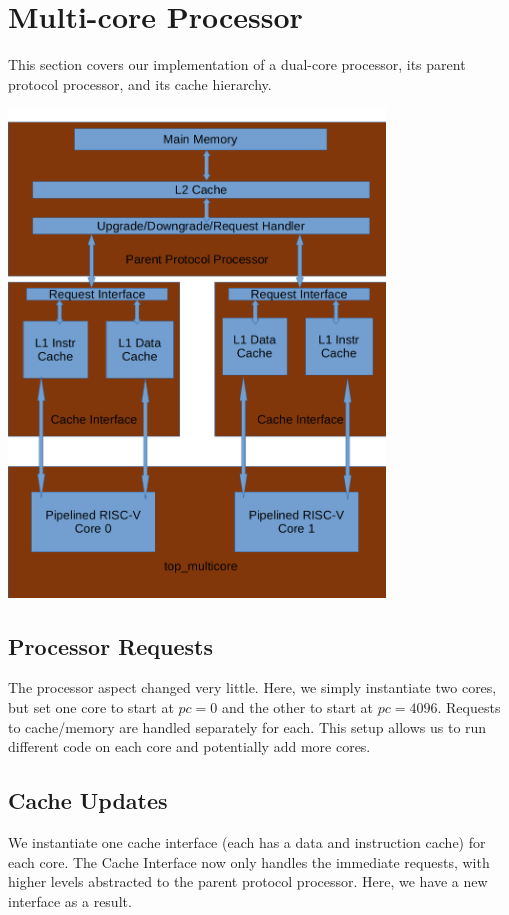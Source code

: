 \documentclass{article}
\begin{document}
\section{Multi-core Processor}

This section covers our implementation of a dual-core processor, its parent protocol processor, and its cache hierarchy.

\includegraphics[width=10cm]{multicore.png}

\subsection{Processor Requests}

The processor aspect changed very little. Here, we simply instantiate two cores, but set one core to start at $pc=0$ and the other to start at $pc=4096$. Requests to cache/memory are handled separately for each. This setup allows us to run different code on each core and potentially add more cores.

\subsection{Cache Updates}

We instantiate one cache interface (each has a data and instruction cache) for each core. The Cache Interface now only handles the immediate requests, with higher levels abstracted to the parent protocol processor. Here, we have a new interface as a result.
\end{document}
